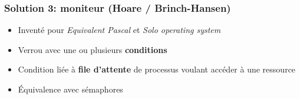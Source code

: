 \documentclass{beamer}
\newcommand\ignore[1]{}
\begin{document}
\begin{frame}
  \frametitle{Solution 3: \textbf{moniteur} (Hoare / Brinch-Hansen)}
  \begin{minipage}{.49\textwidth}
    \begin{itemize}
    \item Inventé pour \textit{Equivalent Pascal} et \textit{Solo operating
        system}
    \item Verrou avec une ou plusieurs \textbf{conditions}
    \item Condition liée à \textbf{file d'attente} de processus voulant
      accéder à une ressource
    \item Équivalence avec sémaphores
    \end{itemize}
  \end{minipage}
  \begin{minipage}{.49\textwidth}
    \begin{center}
    \end{center}
  \end{minipage}
\end{frame} %
\ignore{



}
\end{document}

